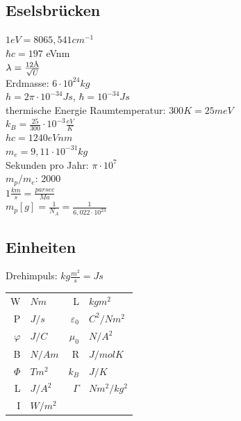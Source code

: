 \documentclass[12pt,a4paper, twoside]{article}
\renewcommand{\=}[1]{\stackrel{#1}{=}}
\theoremstyle{definition}
\theoremstyle{remark}
\begin{document}
\subsection{Eselsbrücken}

$1eV = 8065,541 cm^{-1}$\\
$\hbar c = 197$ eVnm\\
$\lambda = \frac{12{\text \AA}}{\sqrt{U}}$\\
Erdmasse: $6 \cdot 10^{24} kg$\\
$h = 2 \pi \cdot 10^{-34} Js$, $\hbar = 10^{-34} Js$\\
thermische Energie Raumtemperatur: $300K = 25meV$\\
$k_B = \frac{25}{300} \cdot 10^{-3} \frac{eV}{K}$\\
$hc = 1240 eVnm$\\
$m_e = 9,11 \cdot 10^{-31}kg$\\
Sekunden pro Jahr: $\pi \cdot 10^7$\\
$m_p / m_e$: $2000$\\
$1 \frac{km}{s}  = \frac{parsec}{Ma}$\\
$m_p[g] = \frac{1}{N_A} = \frac{1}{6,022 \cdot 10^{23}}$


\subsection{Einheiten}



Drehimpuls: $kg \frac{m^2}{s} = Js$\\
\begin{tabular}{r|l||r|l}
W & $Nm$ & L & $kgm^2$\\
P & $J/s$ & $\varepsilon_0$ & $C^2/Nm^2$\\
$\varphi$ & $J/C$ & $\mu_0$ & $N/A^2$\\
B & $N/Am$ & R & $J/mol K$\\
$\Phi$ & $Tm^2$ & $k_B$ & $J/K$\\
L & $J/A^2$ & $\Gamma$ & $Nm^2/kg^2$\\
I & $W/m^2$ & &
\end{tabular}
\end{document}
